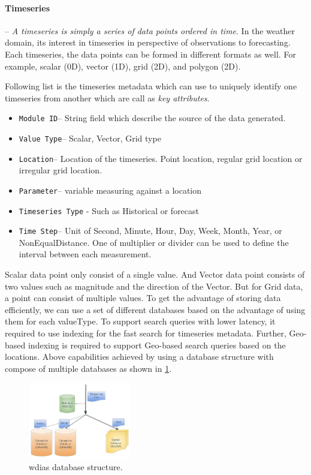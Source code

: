 \documentclass[conference]{IEEEtran}
\begin{document}
\paragraph{Timeseries}-- \emph{A timeseries is simply a series of data points ordered in time}. In the weather domain, its interest in timeseries in perspective of observations to forecasting. Each timeseries, the data points can be formed in different formats as well. For example, scalar (0D), vector (1D), grid (2D), and polygon (2D).

Following list is the timeseries metadata which can use to uniquely identify one timeseries from another which are call as \emph{key attributes}.

\begin{itemize}
    \item \texttt{Module ID}--  String field which describe the source of the data generated.
    \item \texttt{Value Type}--  Scalar, Vector, Grid type
    \item \texttt{Location}-- Location of the timeseries. Point location, regular grid location or irregular grid location.
    \item \texttt{Parameter}-- variable measuring against a location
    \item \texttt{Timeseries Type} - Such as Historical or forecast
    \item \texttt{Time Step}-- Unit of Second, Minute, Hour, Day, Week, Month, Year, or NonEqualDistance. One of multiplier or divider can be used to define the interval between each measurement.
\end{itemize}

Scalar data point only consist of a single value. And Vector data point consists of two values such as magnitude and the direction of the Vector. But for Grid data, a point can consist of multiple values. To get the advantage of storing data efficiently, we can use a set of different databases based on the advantage of using them for each valueType. To support search queries with lower latency, it required to use indexing for the fast search for timeseries metadata. Further, Geo-based indexing is required to support Geo-based search queries based on the locations. Above capabilities achieved by using a database structure with compose of multiple databases as shown in \cref{pfi:database_structure}.

\begin{figure}[htbp]
\centerline{\includegraphics[width=0.4\textwidth]{method/microservice/wdias_database_structure.jpg}}
\caption{\acrshort{wdias} database structure.}
\label{pfi:database_structure}
\end{figure}
\end{document}
